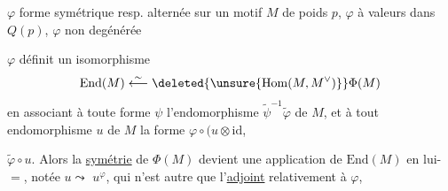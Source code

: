 \margin{\unsure{\ensuremath{\Vert\;\Vert}}}
$\varphi$ forme symétrique resp. alternée sur un motif $M$ de
poids $p$, $\varphi$ à valeurs dans $Q(p)$, $\varphi$ non
degénérée

$\varphi$ définit un isomorphisme
\[
\mathrm{End}(M)\mathrel{\mathop{\longleftarrow}\limits^{\sim}}\deleted{\unsure{\mathrm{Hom}(M,M^{\vee})}}\Phi(M)
\]
en associant à toute forme $\psi$ l'endomorphisme
$\widetilde\psi^{-1}\widetilde\varphi$ de $M$, et à tout
endomorphisme $u$ de $M$ la
forme $\varphi\circ(u\otimes\mathrm{id}$,  



$\widetilde\varphi\circ u$. Alors la \uline{symétrie} de $\Phi(M)$ devient
une application de $\mathrm{End}(M)$ en lui-$=$, notée $u\leadsto$
$u^\varphi$, qui n'est autre que l'\uline{adjoint}
relativement à $\varphi$,
